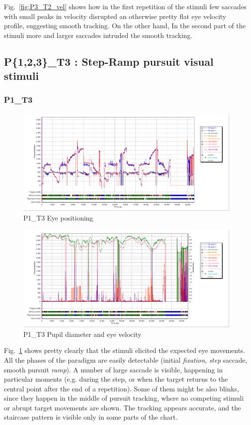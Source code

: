 Fig.~\ref{fig:P3_T2_vel} shows how in the first repetition of the stimuli few saccades with small peaks in velocity disrupted an otherwise pretty flat eye velocity profile, suggesting smooth tracking. On the other hand, In the second part of the stimuli more and larger saccades intruded the smooth tracking.


\subsection{P\{1,2,3\}\_T3 : Step-Ramp pursuit visual stimuli}
\label{sec:P123_T3}

\subsubsection{P1\_T3}
\label{sec:P1_T3}

\begin{figure}[t]
  \centering
  \includegraphics[width=.8\textwidth]{figures/graphs/P1_T3(stepRamp)_XY.png}
  \caption[P1\_T3 Eye positioning]{P1\_T3 Eye positioning}
  \label{fig:P1_T3_pos}
\end{figure}

\begin{figure}[t]
  \centering
  \includegraphics[width=.8\textwidth]{figures/graphs/P1_T3(stepRamp)_VP.png}
  \caption[P1\_T3 Pupil size and velocity profile]{P1\_T3 Pupil diameter and eye velocity}
  \label{fig:P1_T3_vel}
\end{figure}

Fig.~\ref{fig:P1_T3_pos} shows pretty clearly that the stimuli elicited the expected eye movements. All the phases of the paradigm are easily detectable (initial \textit{fixation}, \textit{step} saccade, smooth pursuit \textit{ramp}). A number of large saccade is visible, happening in particular moments (e.g. during the step, or when the target returns to the central point after the end of a repetition). Some of them might be also blinks, since they happen in the middle of pursuit tracking, where no competing stimuli or abrupt target movements are shown. The tracking appears accurate, and the staircase pattern is visible only in some parts of the chart.




